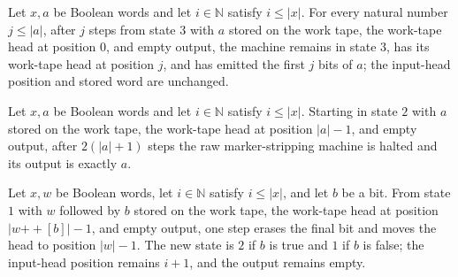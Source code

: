 \begin{lemma}
\label{Turing.FinTM.rawStrip_replay}
\leanok
{}
Let $x,a$ be Boolean words and let $i\in\mathbb{N}$ satisfy $i\le |x|$. For every
natural number $j\le |a|$, after $j$ steps from state $3$ with $a$ stored on the work
tape, the work-tape head at position $0$, and empty output, the machine remains in state
$3$, has its work-tape head at position $j$, and has emitted the first $j$ bits of $a$;
the input-head position and stored word are unchanged.
\end{lemma}

\begin{lemma}
\label{Turing.FinTM.rawStrip_finish}
\leanok
{}
Let $x,a$ be Boolean words and let $i\in\mathbb{N}$ satisfy $i\le |x|$. Starting in
state $2$ with $a$ stored on the work tape, the work-tape head at position $|a|-1$, and
empty output, after $2(|a|+1)$ steps the raw marker-stripping machine is halted and its
output is exactly $a$.
\end{lemma}

\begin{lemma}
\label{Turing.FinTM.rawStrip_erase}
\leanok
{}
Let $x,w$ be Boolean words, let $i\in\mathbb{N}$ satisfy $i\le |x|$, and let $b$ be a
bit. From state $1$ with $w$ followed by $b$ stored on the work tape, the work-tape head
at position $|w\mathbin{++}[b]|-1$, and empty output, one step erases the final bit and
moves the head to position $|w|-1$. The new state is $2$ if $b$ is true and $1$ if $b$
is false; the input-head position remains $i+1$, and the output remains empty.
\end{lemma}

